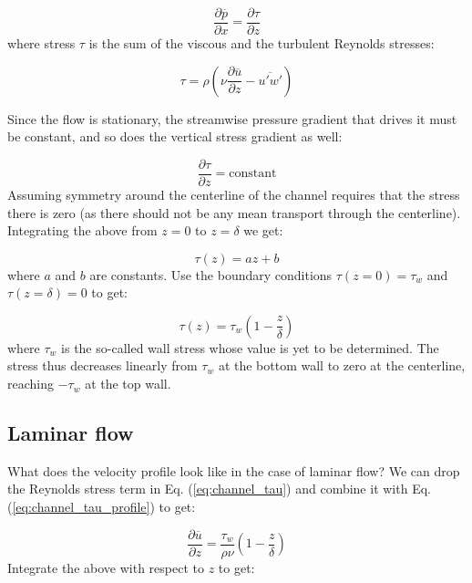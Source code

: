 \documentclass[12pt]{article}
\numberwithin{equation}{section}
\numberwithin{figure}{section}
\numberwithin{table}{section}
\begin{document}
\begin{equation}
  \frac{\partial \overline{p}}{\partial x} =
  \frac{\partial \tau}{\partial z}
\end{equation}
where stress $\tau$ is the sum of the viscous and the turbulent Reynolds
stresses:

\begin{equation}
  \tau = \rho \left( \nu \frac{\partial \overline{u}}{\partial z} - \overline{u'w'} \right)
  \label{eq:channel_tau}
\end{equation}

Since the flow is stationary, the streamwise pressure gradient that drives it
must be constant, and so does the vertical stress gradient as well:

\begin{equation}
  \frac{\partial \tau}{\partial z} = \text{constant}
\end{equation}
Assuming symmetry around the centerline of the channel requires that the stress
there is zero (as there should not be any mean transport through the centerline).
Integrating the above from $z=0$ to $z=\delta$ we get:

\begin{equation}
  \tau(z) = a z + b
\end{equation}
where $a$ and $b$ are constants.
Use the boundary conditions $\tau(z=0) = \tau_w$ and $\tau(z=\delta) = 0$ to get:

\begin{equation}
  \tau(z) = \tau_w \left( 1 - \frac{z}{\delta} \right)
  \label{eq:channel_tau_profile}
\end{equation}
where $\tau_w$ is the so-called wall stress whose value is yet to be determined.
The stress thus decreases linearly from $\tau_w$ at the bottom wall to zero at
the centerline, reaching $-\tau_w$ at the top wall.

\subsection{Laminar flow}

What does the velocity profile look like in the case of laminar flow?
We can drop the Reynolds stress term in Eq. (\ref{eq:channel_tau}) and combine
it with Eq. (\ref{eq:channel_tau_profile}) to get:

\begin{equation}
  \frac{\partial \overline{u}}{\partial z} = \frac{\tau_w}{\rho \nu} \left(1 - \frac{z}{\delta}\right)
\end{equation}
Integrate the above with respect to $z$ to get:
\end{document}
